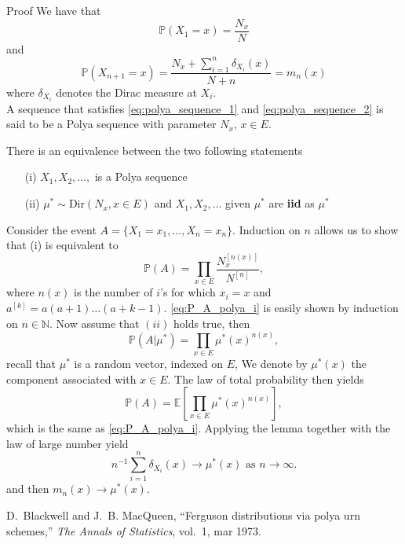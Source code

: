 \documentclass{beamer}
\makeatletter
\newcommand*{\iid}{\textbf{iid}\@\xspace}
\def \E{\mathbb E}
\makeatother
\begin{document}
\begin{frame}[allowframebreaks]{Proof}
\scriptsize
We have that 
\begin{equation}\label{eq:polya_sequence_1}
\mathbb{P}(X_1=x) = \frac{N_x}{N}
\end{equation}
and 
\begin{equation}\label{eq:polya_sequence_2}
\mathbb{P}(X_{n+1}=x) = \frac{N_x + \sum_{i=1}^n\delta_{X_i}(x)}{N+n} = m_n(x)
\end{equation}
where $\delta_{X_i}$ denotes the Dirac measure at $X_i$.\\
A sequence that satisfies \eqref{eq:polya_sequence_1} and \eqref{eq:polya_sequence_2} is said to be a Polya sequence with parameter $N_x\text{, }x\in E$.

\begin{lemma}
There is an equivalence between the two following statements
\begin{itemize}
\item[(i)] $X_1,X_2,\ldots,$ is a Polya sequence
\item[(ii)] $\mu^{\ast}\sim \text{Dir}(N_x,x\in E)$ and $X_1,X_2,\ldots$ given $\mu^\ast$ are \iid as $\mu^\ast$
\end{itemize}
\end{lemma}
Consider the event $A = \{X_1 = x_1,\ldots, X_n = x_n\}$. Induction on $n$ allows us to show that (i) is equivalent to 
\begin{equation}\label{eq:P_A_polya_i}
\mathbb{P}(A) = \prod_{x\in E} \frac{N_x^{[n(x)]}}{N^{[n]}},
\end{equation}
where $n(x)$ is the number of $i$'s for which $x_i = x$ and $a^{[k]} = a(a+1)\ldots(a+k-1)$. \eqref{eq:P_A_polya_i} is easily shown by induction on $n\in\mathbb{N}$. Now assume that $(ii)$ holds true, then 
$$
\mathbb{P}(A|\mu^\ast) = \prod_{x\in E}\mu^\ast(x)^{n(x)},
$$
recall that $\mu^\ast$ is a random vector, indexed on $E$, We denote by $\mu^\ast(x)$ the component associated with $x\in E$. The law of total probability then yields
\begin{equation}\label{eq:P_A_polya_ii}
\mathbb{P}(A) = \E\left[\prod_{x\in E}\mu^\ast(x)^{n(x)}\right],
\end{equation}
which is the same as \eqref{eq:P_A_polya_i}. Applying the lemma together with the law of large number yield 
$$
n^{-1}\sum_{i=1}^n\delta_{X_i}(x) \rightarrow \mu^{\ast}(x)\text{ as } n\rightarrow\infty.
$$
and then $m_n(x)\rightarrow\mu^{\ast}(x)$.
\tiny
\begin{thebibliography}{1}
D.~Blackwell and J.~B. MacQueen, ``Ferguson distributions via polya urn
  schemes,'' {\em The Annals of Statistics}, vol.~1, mar 1973.
  \end{thebibliography}
\end{frame}
\end{document}

